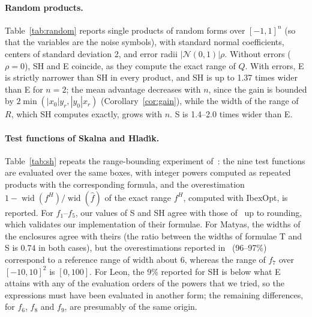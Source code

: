 \documentclass[10pt]{article}
\theoremstyle{definition}
\newcommand{\wid}{\operatorname{wid}}
\begin{document}
\paragraph{Random products.} Table~\ref{tab:random} reports single products of random forms over $[-1,1]^n$ (so that the variables are the noise symbols), with standard normal coefficients, centers of standard deviation 2, and error radii $|\mathcal N(0,1)|\rho$. Without errors ($\rho=0$), SH and E coincide, as they compute the exact range of $Q$. With errors, E is strictly narrower than SH in every product, and SH is up to 1.37 times wider than E for $n=2$; the mean advantage decreases with $n$, since the gain is bounded by $2\min(|x_0|y_r,|y_0|x_r)$ (Corollary~\ref{cor:gain}), while the width of the range of $R$, which SH computes exactly, grows with $n$. S is 1.4--2.0 times wider than E.



\paragraph{Test functions of Skalna and Hlad\'{\i}k.} Table~\ref{tab:sh} repeats the range-bounding experiment of~\cite[Table~3]{skalna2017new}: the nine test functions are evaluated over the same boxes, with integer powers computed as repeated products with the corresponding formula, and the overestimation $1-\wid(f^H)/\wid(\hat f)$ of the exact range $f^H$, computed with IbexOpt, is reported. For $f_1$--$f_5$, our values of S and SH agree with those of~\cite{skalna2017new} up to rounding, which validates our implementation of their formulae. For Matyas, the widths of the enclosures agree with theirs (the ratio between the widths of formulae T and S is $0.74$ in both cases), but the overestimations reported in~\cite{skalna2017new} (96--97\%) correspond to a reference range of width about 6, whereas the range of $f_7$ over $[-10,10]^2$ is $[0,100]$. For Leon, the 9\% reported for SH is below what E attains with any of the evaluation orders of the powers that we tried, so the expressions must have been evaluated in another form; the remaining differences, for $f_6$, $f_8$ and $f_9$, are presumably of the same origin.

\begin{table}[H]
\centering
\caption{Overestimation (\%) of the exact range of the test functions of~\cite{skalna2017new}, with integer powers computed as repeated products. The values of E are in bold when E is narrower than SH.}
\label{tab:sh}
\small

\end{table}
\end{document}
